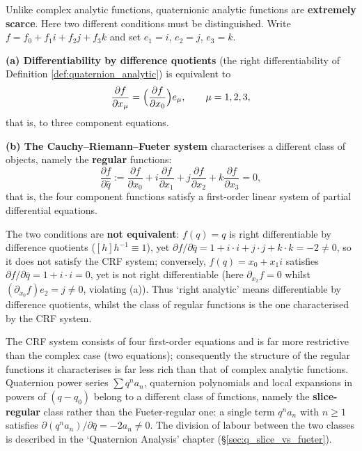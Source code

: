 \begin{remark}\label{rem:quaternion_analytic_difference}
Unlike complex analytic functions, quaternionic analytic functions are \textbf{extremely scarce}. Here two different conditions must be distinguished. Write $f = f_0 + f_1 i + f_2 j + f_3 k$ and set $e_1 = i$, $e_2 = j$, $e_3 = k$.

\textbf{(a) Differentiability by difference quotients} (the right differentiability of Definition \ref{def:quaternion_analytic}) is equivalent to
\[
\frac{\partial f}{\partial x_\mu} = \Bigl(\frac{\partial f}{\partial x_0}\Bigr) e_\mu, \qquad \mu = 1, 2, 3,
\]
that is, to three component equations.

\textbf{(b) The Cauchy--Riemann--Fueter system} characterises a different class of objects, namely the \textbf{regular} functions:
\[
\frac{\partial f}{\partial \bar q} := \frac{\partial f}{\partial x_0} + i\frac{\partial f}{\partial x_1} + j\frac{\partial f}{\partial x_2} + k\frac{\partial f}{\partial x_3} = 0,
\]
that is, the four component functions satisfy a first-order linear system of partial differential equations.

The two conditions are \textbf{not equivalent}: $f(q) = q$ is right differentiable by difference quotients ($[h]h^{-1} \equiv 1$), yet $\partial f/\partial\bar q = 1 + i\cdot i + j\cdot j + k\cdot k = -2 \neq 0$, so it does not satisfy the CRF system; conversely, $f(q) = x_0 + x_1 i$ satisfies $\partial f/\partial\bar q = 1 + i\cdot i = 0$, yet is not right differentiable (here $\partial_{x_2}f = 0$ whilst $(\partial_{x_0}f)e_2 = j \neq 0$, violating (a)). Thus `right analytic' means differentiable by difference quotients, whilst the class of regular functions is the one characterised by the CRF system.

The CRF system consists of four first-order equations and is far more restrictive than the complex case (two equations); consequently the structure of the regular functions it characterises is far less rich than that of complex analytic functions. Quaternion power series $\sum q^n a_n$, quaternion polynomials and local expansions in powers of $(q-q_0)$ belong to a different class of functions, namely the \textbf{slice-regular} class rather than the Fueter-regular one: a single term $q^n a_n$ with $n\ge 1$ satisfies $\partial(q^n a_n)/\partial\bar q=-2a_n\neq 0$. The division of labour between the two classes is described in the `Quaternion Analysis' chapter (\S\ref{sec:q_slice_vs_fueter}).
\end{remark}

